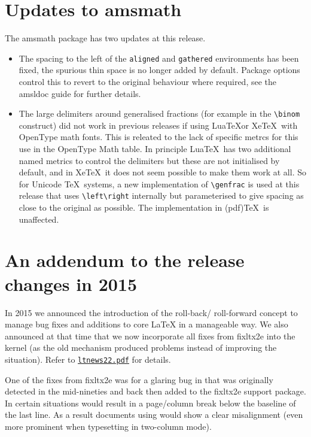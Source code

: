 \documentclass{ltnews}
\begin{document}
\section{Updates to \textsf{amsmath}}
The \textsf{amsmath} package has two updates at this release.
\begin{itemize}
\item The spacing to the left of the \texttt{aligned} and
  \texttt{gathered} environments has been fixed, the spurious thin
  space is no longer added by default. Package options control this
  to revert to the original behaviour where required, see the
  \textsf{amsldoc} guide for further details. 
\item The large delimiters around generalised fractions (for example
  in the \verb|\binom| construct) did not work in previous releases if
  using Lua\TeX or Xe\TeX\ with OpenType math fonts. This is releated
  to the lack of specific metrcs for this use in the OpenType Math
  table. In principle Lua\TeX\ has two additional named metrics
  to control the delimiters but these are not initialised by default,
  and in Xe\TeX\ it does not seem possible to make them work at all.
  So for Unicode \TeX\ systems, a new implementation of
  \verb|\genfrac| is used at this release that uses \verb|\left\right|
  internally but parameterised to give spacing as close to the
  original as possible. The implementation in (pdf)\TeX\ is
  unaffected.
\end{itemize}

\section{An addendum to the release changes in 2015}

In 2015 we announced the introduction of the roll-back\slash
roll-forward concept to manage bug fixes and additions to core
\LaTeX{} in a manageable way. We also announced at that time
that we now incorporate all fixes from \textsf{fixltx2e} into the
kernel (as the old mechanism produced problems instead of improving
the situation). Refer to
\href{https://www.latex-project.org/news/latex2e-news/ltnews22.pdf}{\texttt{ltnews22.pdf}}
for details.

One of the fixes from \textsf{fixltx2e} was for a glaring bug in
 that was originally detected in the mid-nineties and
back then added to the \textsf{fixltx2e} support package. In certain
situations  would result in a page/column break below
the baseline of the last line. As a result documents using
 would show a clear misalignment (even more prominent
when typesetting in two-column mode).
\end{document}
